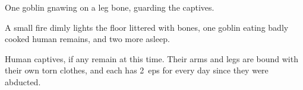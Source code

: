 \documentclass[10pt,twoside]{book}
\begin{document}
One goblin gnawing on a leg bone, guarding the captives.

A small fire dimly lights the floor littered with bones, one goblin eating badly cooked human remains, and two more asleep.

Human captives, if any remain at this time.
Their arms and legs are bound with their own torn clothes, and each has 2~\glspl{ep} for every day since they were abducted.

\hobgoblin

\end{document}
